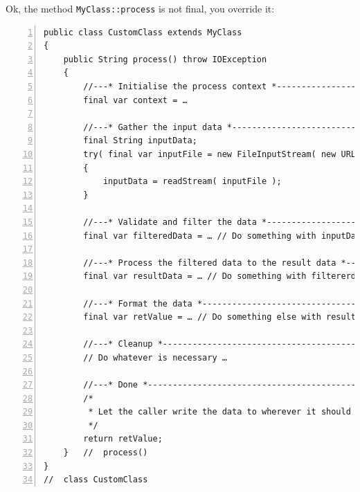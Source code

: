 \documentclass[11pt,a4paper, titlepage, parskip=half, headsepline, footsepline, cleardoublepage=current, headheight=1cm]{scrbook}
\begin{document}
Ok, the method \lstinline|MyClass::process| is not final, you override it:

\begin{lstlisting}[numbers=left]
public class CustomClass extends MyClass
{
    public String process() throw IOException
    {
        //---* Initialise the process context *----------------------
        final var context = …
        
        //---* Gather the input data *-------------------------------
        final String inputData;
        try( final var inputFile = new FileInputStream( new URL( "192.168.0.1" ).openStream() )
        {
            inputData = readStream( inputFile );
        }
        
        //---* Validate and filter the data *------------------------
        final var filteredData = … // Do something with inputData
        
        //---* Process the filtered data to the result data *--------
        final var resultData = … // Do something with filtererdData
        
        //---* Format the data *-------------------------------------
        final var retValue = … // Do something else with resultData
        
        //---* Cleanup *---------------------------------------------
        // Do whatever is necessary …
        
        //---* Done *------------------------------------------------
        /*
         * Let the caller write the data to wherever it should end up.
         */
        return retValue; 
    }   //  process()
}
//  class CustomClass
\end{lstlisting}
\end{document}

